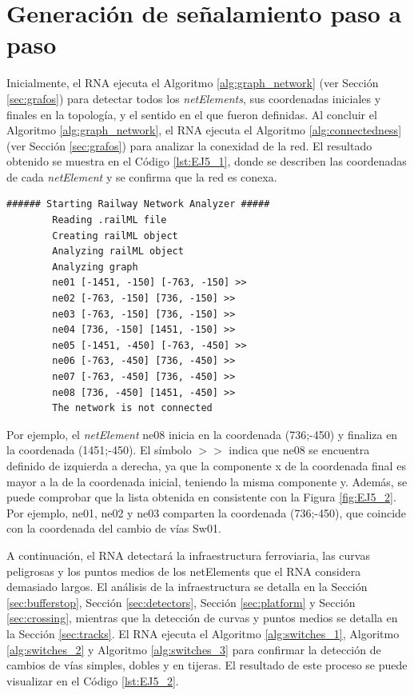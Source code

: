 \section{Generación de señalamiento paso a paso}

	Inicialmente, el RNA ejecuta el Algoritmo \ref{alg:graph_network} (ver Sección \ref{sec:grafos}) para detectar todos los \textit{netElements}, sus coordenadas iniciales y finales en la topología, y el sentido en el que fueron definidas. Al concluir el Algoritmo \ref{alg:graph_network}, el RNA ejecuta el Algoritmo \ref{alg:connectedness} (ver Sección \ref{sec:grafos}) para analizar la conexidad de la red. El resultado obtenido se muestra en el Código \ref{lst:EJ5_1}, donde se describen las coordenadas de cada \textit{netElement} y se confirma que la red es conexa.
	
	\begin{lstlisting}[language = {}, caption = Detección de \textit{netElements} por parte del RNA , label = {lst:EJ5_1}]
		###### Starting Railway Network Analyzer #####
		Reading .railML file
		Creating railML object
		Analyzing railML object
		Analyzing graph
		ne01 [-1451, -150] [-763, -150] >>
		ne02 [-763, -150] [736, -150] >>
		ne03 [-763, -150] [736, -150] >>
		ne04 [736, -150] [1451, -150] >>
		ne05 [-1451, -450] [-763, -450] >>
		ne06 [-763, -450] [736, -450] >>
		ne07 [-763, -450] [736, -450] >>
		ne08 [736, -450] [1451, -450] >>
		The network is not connected
	\end{lstlisting}
	
	Por ejemplo, el \textit{netElement} ne08 inicia en la coordenada (736;-450) y finaliza en la coordenada (1451;-450). El símbolo $>>$ indica que ne08 se encuentra definido de izquierda a derecha, ya que la componente x de la coordenada final es mayor a la de la coordenada inicial, teniendo la misma componente y. Además, se puede comprobar que la lista obtenida en consistente con la Figura \ref{fig:EJ5_2}. Por ejemplo, ne01, ne02 y ne03 comparten la coordenada (736;-450), que coincide con la coordenada del cambio de vías Sw01.
	
	A continuación, el RNA detectará la infraestructura ferroviaria, las curvas peligrosas y los puntos medios de los netElements que el RNA considera demasiado largos. El análisis de la infraestructura se detalla en la Sección \ref{sec:bufferstop}, Sección \ref{sec:detectors}, Sección \ref{sec:platform} y Sección \ref{sec:crossing}, mientras que la detección de curvas y puntos medios se detalla en la Sección \ref{sec:tracks}. El RNA ejecuta el Algoritmo \ref{alg:switches_1}, Algoritmo \ref{alg:switches_2} y Algoritmo \ref{alg:switches_3} para confirmar la detección de cambios de vías simples, dobles y en tijeras. El resultado de este proceso se puede visualizar en el Código \ref{lst:EJ5_2}.
	
